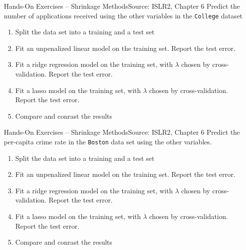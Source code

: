 \documentclass[ignorenonframetext,xcolor=x11names]{beamer}
\begin{document}
\begin{frame}{Hands-On Exercises -- Shrinkage Methods}{Source: ISLR2, Chapter 6}
Predict the number of applications received using the other variables in the \texttt{College} dataset
  \begin{enumerate} 
      \item Split the data set into a training and a test set
      \item Fit an unpenalized linear model on the training set. Report the test error.
      \item Fit a ridge regression model on the training set, with $\lambda$ chosen by cross-validation. Report the test error.
      \item Fit a lasso model on the training set, with $\lambda$ chosen by cross-validation. Report the test error.
      \item Compare and conrast the results
  \end{enumerate}
\end{frame}

\begin{frame}{Hands-On Exercises -- Shrinkage Methods}{Source: ISLR2, Chapter 6}
Predict the per-capita crime rate in the \texttt{Boston} data set using the other variables.
  \begin{enumerate}
      \item Split the data set into a training and a test set
      \item Fit an unpenalized linear model on the training set. Report the test error.
      \item Fit a ridge regression model on the training set, with $\lambda$ chosen by cross-validation. Report the test error.
      \item Fit a lasso model on the training set, with $\lambda$ chosen by cross-validation. Report the test error.
      \item Compare and conrast the results
  \end{enumerate}
\end{frame}
\end{document}
